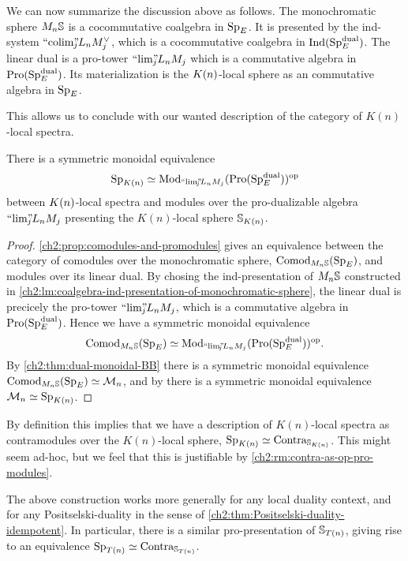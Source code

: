 We can now summarize the discussion above as follows. The monochromatic sphere $M_n\S$ is a cocommutative coalgebra in $\SpE$. It is presented by the ind-system $\indcolim L_n M_j^\vee$, which is a cocommutative coalgebra in $\Ind(\SpE\dual)$. The linear dual is a pro-tower $\prolim L_n M_j$ which is a commutative algebra in $\Pro(\SpE\dual)$. Its materialization is the $\Kn$-local sphere as an commutative algebra in $\SpE$. 

This allows us to conclude with our wanted description of the category of $K(n)$-local spectra. 

\begin{theorem}
    \label{ch2:thm:Kn-is-pro-modules}
    There is a symmetric monoidal equivalence 
    \[\Sp_\Kn \simeq \Mod_{\prolim L_n M_j}(\Pro(\SpE\dual))\op\]
    between $\Kn$-local spectra and modules over the pro-dualizable algebra $\prolim L_n M_j$ presenting the $K(n)$-local sphere $\S_{\Kn}$. 
\end{theorem}
\begin{proof}
    \cref{ch2:prop:comodules-and-promodules} gives an equivalence between the category of comodules over the monochromatic sphere, $\Comod_{M_n \S}(\SpE)$, and modules over its linear dual. By chosing the ind-presentation of $M_n \S$ constructed in \cref{ch2:lm:coalgebra-ind-presentation-of-monochromatic-sphere}, the linear dual is precicely the pro-tower $\prolim L_n M_j$, which is a commutative algebra in $\Pro(\SpE\dual)$. Hence we have a symmetric monoidal equivalence 
    \[\Comod_{M_n\S}(\SpE)\simeq \Mod_{\prolim L_n M_j}(\Pro(\SpE\dual))\op.\]
    By \cref{ch2:thm:dual-monoidal-BB} there is a symmetric monoidal equivalence $\Comod_{M_n\S}(\SpE)\simeq \Mn$, and by \cite[6.19]{hovey-strickland_99} there is a symmetric monoidal equivalence $\Mn \simeq \Sp_{\Kn}$. 
\end{proof}

\begin{remark}
    By definition this implies that we have a description of $K(n)$-local spectra as contramodules over the $K(n)$-local sphere, $\SpK \simeq \Contra_{\S_\Kn}$. This might seem ad-hoc, but we feel that this is justifiable by \cref{ch2:rm:contra-as-op-pro-modules}.
\end{remark}

\begin{remark}
    The above construction works more generally for any local duality context, and for any Positselski-duality in the sense of \cref{ch2:thm:Positselski-duality-idempotent}. In particular, there is a similar pro-presentation of $\S_{\Tn}$, giving rise to an equivalence $\Sp_{\Tn}\simeq \Contra_{\S_{\Tn}}$.
\end{remark}

